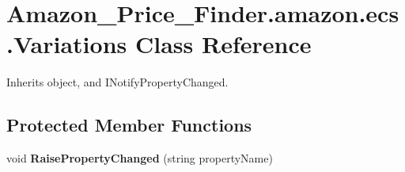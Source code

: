 \hypertarget{class_amazon___price___finder_1_1amazon_1_1ecs_1_1_variations}{\section{Amazon\-\_\-\-Price\-\_\-\-Finder.\-amazon.\-ecs.\-Variations Class Reference}
\label{class_amazon___price___finder_1_1amazon_1_1ecs_1_1_variations}
}


 




Inherits object, and I\-Notify\-Property\-Changed.

\subsection*{Protected Member Functions}
\begin{DoxyCompactItemize}
\item 
\hypertarget{class_amazon___price___finder_1_1amazon_1_1ecs_1_1_variations_a5cc2e6462f54a49fa8f31e17a7a95985}{void {\bfseries Raise\-Property\-Changed} (string property\-Name)}\label{class_amazon___price___finder_1_1amazon_1_1ecs_1_1_variations_a5cc2e6462f54a49fa8f31e17a7a95985}

\end{DoxyCompactItemize}
